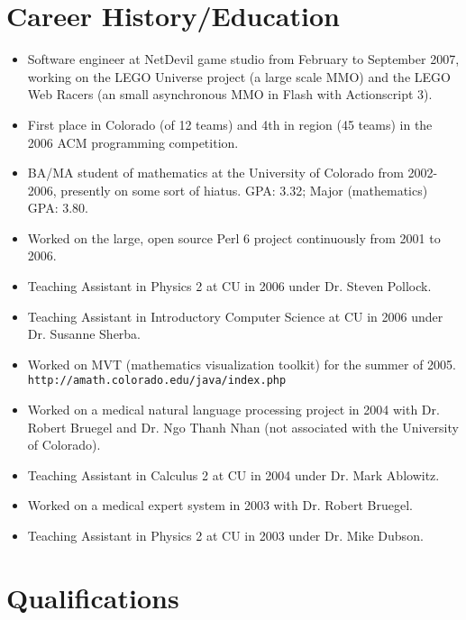 \documentclass[12pt]{article}
\begin{document}
\section*{Career History/Education}

\begin{itemize}
\item Software engineer at NetDevil game studio from February to
September 2007, working on the LEGO Universe project (a large scale MMO)
and the LEGO Web Racers (an small asynchronous MMO in Flash with
Actionscript 3).
\item First place in Colorado (of 12 teams) and 4th in region
(45 teams) in the 2006 ACM programming competition.
\item BA/MA student of mathematics at the University of Colorado
from 2002-2006, presently on some sort of hiatus.  GPA: 3.32; Major
(mathematics) GPA: 3.80.
\item Worked on the large, open source Perl 6 project continuously from
2001 to 2006.
\item Teaching Assistant in Physics 2 at CU in 2006 under Dr. Steven
Pollock.
\item Teaching Assistant in Introductory Computer Science at CU in 2006
under Dr. Susanne Sherba.
\item Worked on MVT (mathematics visualization toolkit) for the summer
of 2005. \verb|http://amath.colorado.edu/java/index.php|
\item Worked on a medical natural language processing project in 2004 with
Dr. Robert Bruegel and Dr. Ngo Thanh Nhan (not associated with the
University of Colorado).
\item Teaching Assistant in Calculus 2 at CU in 2004 under Dr. Mark
Ablowitz.
\item Worked on a medical expert system in 2003 with Dr. Robert Bruegel.
\item Teaching Assistant in Physics 2 at CU in 2003 under Dr. Mike
Dubson.
\end{itemize}

\section*{Qualifications}
\end{document}
